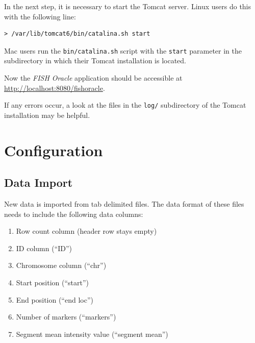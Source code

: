 \documentclass[11pt,final]{article}
\newcommand{\Gt}[0]{\emph{GenomeTools}\xspace}
\newcommand{\Gtj}[0]{\emph{GenomeTools-Java}\xspace}
\newcommand{\FO}[0]{\emph{FISH Oracle}\xspace}
\begin{document}
In the next step, it is necessary to start the Tomcat server. Linux users do
this with the following line:

\begin{lstlisting}
> /var/lib/tomcat6/bin/catalina.sh start
\end{lstlisting}

Mac users run the \texttt{bin/catalina.sh} script with the \texttt{start}
parameter in the subdirectory in which their Tomcat installation is located.

Now the \FO application should be accessible at
\url{http://localhost:8080/fishoracle}.

If any errors occur, a look at the files in the \texttt{log/} subdirectory of
the Tomcat installation may be helpful.





\section{Configuration}

\subsection{Data Import}

New data is imported from tab delimited files. The data format of these files
needs to include the following data columns:

\begin{enumerate}
  \item Row count column (header row stays empty)
  \item ID column (``ID'')
  \item Chromosome column (``chr'')
  \item Start position (``start'')
  \item End position (``end loc'')
  \item Number of markers (``markers'')
  \item Segment mean intensity value (``segment mean'')
\end{enumerate}
\end{document}
